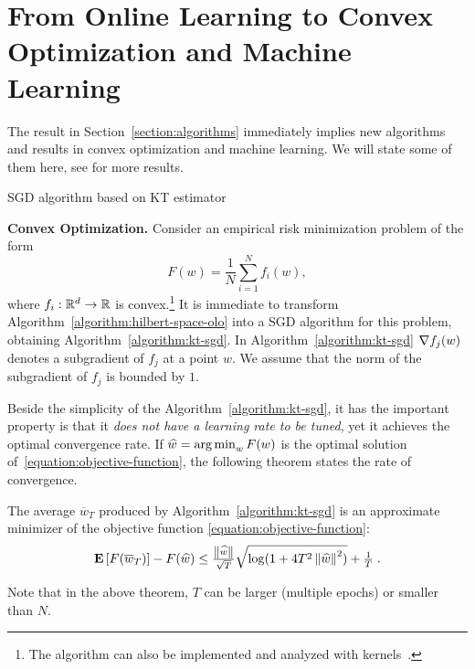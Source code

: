 \section{From Online Learning to Convex Optimization and Machine Learning}
\label{section:applications}

The result in Section~\ref{section:algorithms} immediately implies new
algorithms and results in convex optimization and machine learning. We will state some of them here, see
\cite{Orabona-2014} for more results.

\begin{algorithm}[t]
\caption{SGD algorithm based on KT estimator \label{algorithm:kt-sgd}}
\begin{algorithmic}[1]
{
\ENDFOR
{}
}
\end{algorithmic}
\end{algorithm}

\textbf{Convex Optimization.}
Consider an empirical risk minimization problem of the form
%
\begin{equation}
\label{equation:objective-function}
F(w) = \frac{1}{N} \sum_{i=1}^N f_i(w),
\end{equation}
%
where $f_i:\mathbb{R}^d \to \mathbb{R}$ is convex.\footnote{The algorithm can also be
implemented and analyzed with kernels~\citep{Orabona-2014}.} It is immediate to
transform Algorithm~\ref{algorithm:hilbert-space-olo} into a \ac{SGD} algorithm
for this problem, obtaining Algorithm~\ref{algorithm:kt-sgd}.
In Algorithm~\ref{algorithm:kt-sgd} $\nabla f_j(w)$
denotes a subgradient of $f_j$ at a point $w$.  We assume that the
norm of the subgradient of $f_j$ is bounded by $1$.

Beside the simplicity of the Algorithm~\ref{algorithm:kt-sgd}, it has the
important property is that it \emph{does not have a learning rate to be tuned},
yet it achieves the optimal convergence rate. If $\widehat{w} = \operatorname*{arg\,min}_w F(w)$
is the optimal solution of~\eqref{equation:objective-function}, the following
theorem states the rate of convergence.
%
\begin{theorem}
The average $\overline{w}_T$ produced by Algorithm~\ref{algorithm:kt-sgd} is
an approximate minimizer of the objective function \eqref{equation:objective-function}:
\[
\operatorname*{\mathbf{E}}\left[F(\overline{w}_T)\right] - F(\widehat{w}) \leq \tfrac{\left\|{\widehat{w}}\right\|}{\sqrt{T}} \sqrt{\log(1+4 T^2 \left\|{\widehat{w}}\right\|^2)} +\tfrac{1}{T} \; .
\]
\end{theorem}
%
Note that in the above theorem, $T$ can be larger (multiple epochs) or smaller
than $N$.

